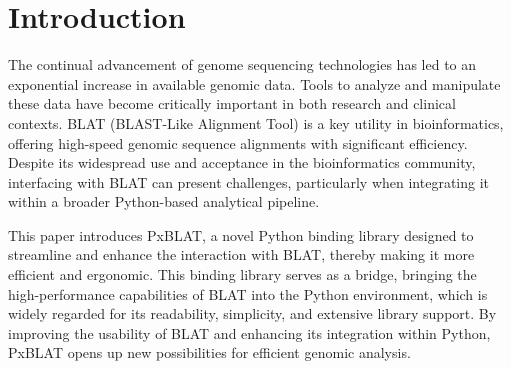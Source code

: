 









\section*{Introduction}\label{sec:introduction}


The continual advancement of genome sequencing technologies has led to an exponential increase in available genomic data.
Tools to analyze and manipulate these data have become critically important in both research and clinical contexts.
BLAT (BLAST-Like Alignment Tool) is a key utility in bioinformatics, offering high-speed genomic sequence alignments with significant efficiency.
Despite its widespread use and acceptance in the bioinformatics community, interfacing with BLAT can present challenges, particularly when integrating it within a broader Python-based analytical pipeline.

This paper introduces PxBLAT, a novel Python binding library designed to streamline and enhance the interaction with BLAT, thereby making it more efficient and ergonomic.
This binding library serves as a bridge, bringing the high-performance capabilities of BLAT into the Python environment, which is widely regarded for its readability, simplicity, and extensive library support.
By improving the usability of BLAT and enhancing its integration within Python, PxBLAT opens up new possibilities for efficient genomic analysis.

